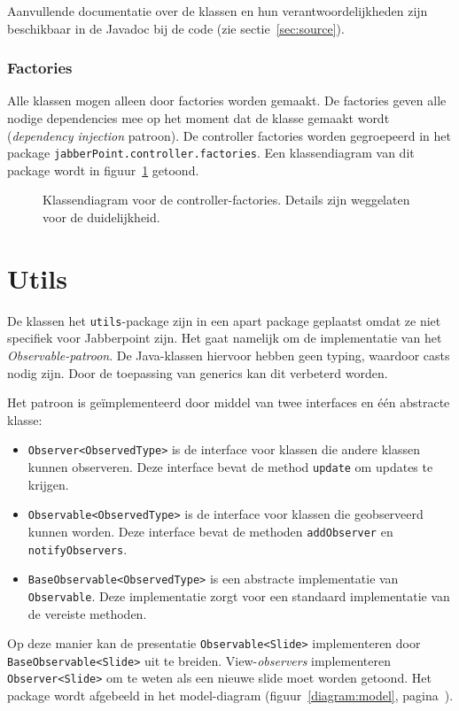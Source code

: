 \documentclass[a4paper]{article}
\newcommand{\code}[1]{\lstinline[columns=fixed]{#1}}
\newcommand{\diagram}[3][1.3]{
	\begin{figure}[!htb]
	 \caption{#3}
	 \label{diagram:#2}
	 \makebox[\textwidth][c]{\texttt{[image: Diagrams/\#2.pdf]}}%
	\end{figure}
}
\begin{document}
		Aanvullende documentatie over de klassen en hun verantwoordelijkheden zijn beschikbaar in de Javadoc bij de code (zie sectie~\ref{sec:source}).

		\subsubsection{Factories}\label{sec:controller-factories}
			Alle klassen mogen alleen door factories worden gemaakt.
			De factories geven alle nodige dependencies mee op het moment dat de klasse gemaakt wordt (\textit{dependency injection} patroon).
			De controller factories worden gegroepeerd in het package \code{jabberPoint.controller.factories}.
			Een klassendiagram van dit package wordt in figuur~\ref{diagram:controller-factories} getoond.

			\diagram[0.8]{controller-factories}{
				Klassendiagram voor de controller-factories.
				Details zijn weggelaten voor de duide\-lijk\-heid.
			}

	\section{Utils}\label{sec:utils}
		De klassen het \code{utils}-package zijn in een apart package geplaatst omdat ze niet specifiek voor Jabberpoint zijn.
		Het gaat namelijk om de implementatie van het \textit{Observable-patroon}.
		De Java-klassen hiervoor hebben geen typing, waardoor casts nodig zijn.
		Door de toepassing van generics kan dit verbeterd worden.
		
		Het patroon is geïmplementeerd door middel van twee interfaces en één abstracte klasse:
		\begin{itemize}
			\item \code{Observer<ObservedType>} is de interface voor klassen die andere klassen kunnen observeren.
				Deze interface bevat de method \code{update} om updates te krijgen.
			\item \code{Observable<ObservedType>} is de interface voor klassen die geobserveerd kunnen worden.
				Deze interface bevat de methoden \code{addObserver} en \code{notify}\-\code{Observers}.
			\item \code{BaseObservable<ObservedType>} is een abstracte implementatie van \code{Ob}\-\code{servable}.
				Deze implementatie zorgt voor een standaard implementatie van de vereiste methoden.
		\end{itemize}

		Op deze manier kan de presentatie \code{Observable<Slide>} implementeren door \code{BaseObservable<Slide>} uit te breiden.
		View-\textit{observers} implementeren \code{Obser}\-\code{ver<Slide>} om te weten als een nieuwe slide moet worden getoond.
		Het package wordt afgebeeld in het model-diagram (figuur~\ref{diagram:model}, pagina~\pageref{diagram:model}).
\end{document}
